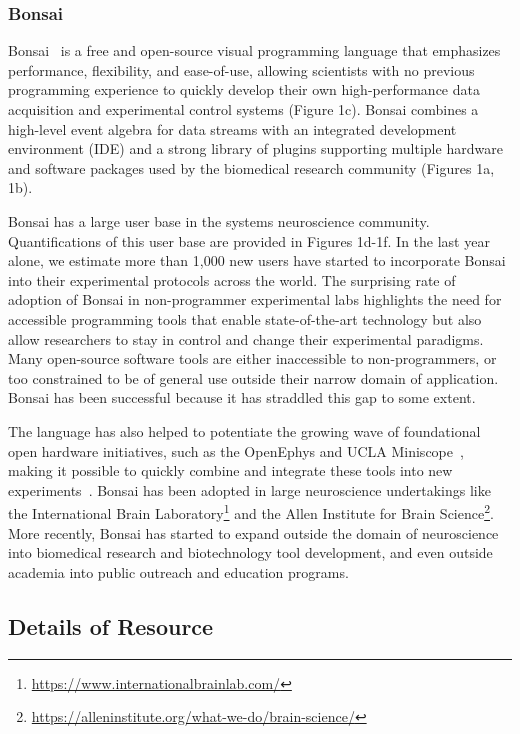 \documentclass[a4paper,11point]{article}
\begin{document}
\subsubsection{Bonsai}
\label{sec:bonsai}

Bonsai~\citep{lopesEtAl15,lopesAndMonteiro21} is a free and open-source visual
programming language that emphasizes performance, flexibility, and ease-of-use,
allowing scientists with no previous programming experience to quickly develop
their own high-performance data acquisition and experimental control systems
(Figure 1c). Bonsai combines a high-level event algebra for data streams with
an integrated development environment (IDE) and a strong library of plugins
supporting multiple hardware and software packages used by the biomedical
research community (Figures 1a, 1b).

Bonsai has a large user base in the systems neuroscience community.
Quantifications of this user base are provided in Figures 1d-1f.  In the last
year alone, we estimate more than 1,000 new users have started to incorporate
Bonsai into their experimental protocols across the world. The surprising rate
of adoption of Bonsai in non-programmer experimental labs highlights the need
for accessible programming tools that enable state-of-the-art technology but
also allow researchers to stay in control and change their experimental
paradigms.  Many open-source software tools are either inaccessible to
non-programmers, or too constrained to be of general use outside their narrow
domain of application. Bonsai has been successful because it has straddled this
gap to some extent.

The language has also helped to potentiate the growing wave of foundational
open hardware initiatives, such as the OpenEphys \citep{siegleEtAl17} and UCLA
Miniscope~\citep{caiEtAl16}, making it possible to quickly combine and
integrate these tools into new experiments~\citep{buccinoEtAl18}.
%
Bonsai has been adopted in large neuroscience undertakings like the
International Brain
Laboratory\footnote{\href{https://www.internationalbrainlab.com/}{https://www.internationalbrainlab.com/}}
and the Allen Institute for Brain
Science\footnote{\href{https://alleninstitute.org/what-we-do/brain-science/}{https://alleninstitute.org/what-we-do/brain-science/}}.
%
More recently, Bonsai has started to expand outside the domain of neuroscience
into biomedical research and biotechnology tool development, and even outside
academia into public outreach and education programs.

\subsection{Details of Resource}
\end{document}
